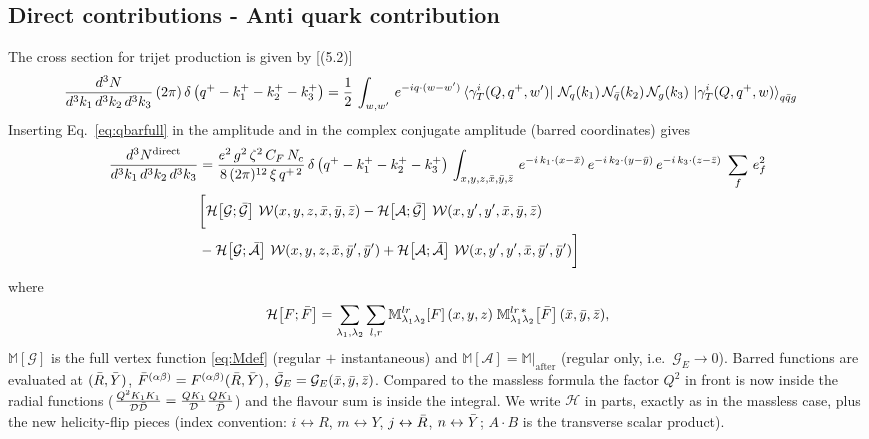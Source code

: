 \documentclass[9pt]{article}
\newcommand{\GE}{\mathcal{G}_{E}}            %
\newcommand{\M}{\mathbb{M}}
\newcommand{\Hs}{\mathcal{H}}
\numberwithin{equation}{section}
\begin{document}
\subsection{Direct contributions - Anti quark contribution}
The cross section for trijet production is given by [(5.2)]
\begin{align}
    \frac{d^{3}N}{d^{3}k_{1}\,d^{3}k_{2}\, d^{3}k_{3}}\, (2\pi)\,\delta\left(q^{+}-k^{+}_{1}-k^{+}_{2}-k^{+}_{3}\right) & =  \frac{1}{2}\,\int_{w,w'}\, e^{-iq\cdot (w-w')}
\bra{\gamma^{i}_{T}(Q,q^{+},w')}\,\mathcal{N}_{q}(k_{1})\,\mathcal{N}_{\Bar{q}}(k_{2})\,\mathcal{N}_{g}(k_{3})\,\ket{\gamma^{i}_{T}(Q,q^{+},w)}_{q\Bar{q}g}
\end{align}
Inserting Eq.~\eqref{eq:qbarfull} in the amplitude and in the complex conjugate amplitude (barred coordinates) gives
\begin{align}\label{eq:dirqbar}
     \frac{d^{3}N^{\text{direct}}}{d^{3}k_{1}\,d^{3}k_{2}\, d^{3}k_{3}} & = \frac{e^{2}\,g^{2}\,\zeta^{2}\,C_{F}\,N_{c}}{8\, (2\pi)^{12}\,\xi\,q^{+\,2}}\, \delta\left(q^{+}-k^{+}_{1}-k^{+}_{2}-k^{+}_{3}\right)\, \int_{x,y,z,\Bar{x},\Bar{y},\Bar{z}}\, e^{-i\,k_{1}\cdot (x-\Bar{x})}\, e^{-i\,k_{2}\cdot (y-\Bar{y})}\, e^{-i\,k_{3}\cdot (z-\Bar{z})}\;\sum_{f}\,e^{2}_{f}\notag \\ & \bigg[ \Hs\!\left[\mathcal{G};\Bar{\mathcal{G}}\right]\,\mathcal{W}(x,y,z,\Bar{x},\Bar{y},\Bar{z})-\Hs\!\left[\mathcal{A};\Bar{\mathcal{G}}\right]\,\mathcal{W}(x,y',y',\Bar{x},\Bar{y},\Bar{z})\notag \\ & -\Hs\!\left[\mathcal{G};\Bar{\mathcal{A}}\right]\,\mathcal{W}(x,y,z,\Bar{x},\Bar{y}',\Bar{y}')+ \Hs\!\left[\mathcal{A};\Bar{\mathcal{A}}\right]\,\mathcal{W}(x,y',y',\Bar{x},\Bar{y}',\Bar{y}')\bigg]
\end{align}
where
$$\Hs\!\left[F;\Bar{F}\right] = \sum_{\lambda_{1},\lambda_{2}}\sum_{l,r}\M^{lr}_{\lambda_{1}\lambda_{2}}\!\left[F\right](x,y,z)\;\M^{lr\,*}_{\lambda_{1}\lambda_{2}}\!\left[\Bar{F}\right](\Bar{x},\Bar{y},\Bar{z}),$$
$\M[\mathcal{G}]$ is the full vertex function \eqref{eq:Mdef} (regular $+$ instantaneous) and $\M[\mathcal{A}] = \M|_{\text{after}}$ (regular only, i.e.\ $\GE\rightarrow 0$). Barred functions are evaluated at $(\Bar{R},\Bar{Y})$, $\Bar{F}^{(\alpha\beta)}=F^{(\alpha\beta)}(\Bar{R},\Bar{Y})$, $\Bar{\mathcal{G}}_{E}=\GE(\Bar{x},\Bar{y},\Bar{z})$. Compared to the massless formula the factor $Q^{2}$ in front is now inside the radial functions ($\frac{Q^{2}K_{1}K_{1}}{\mathcal{D}\Bar{\mathcal{D}}} = \frac{QK_{1}}{\mathcal{D}}\frac{QK_{1}}{\Bar{\mathcal{D}}}$) and the flavour sum is inside the integral. We write $\Hs$ in parts, exactly as in the massless case, plus the new helicity-flip pieces (index convention: $i\leftrightarrow R$, $m\leftrightarrow Y$, $j\leftrightarrow\Bar{R}$, $n\leftrightarrow\Bar{Y}$; $A\cdot B$ is the transverse scalar product).
\end{document}
